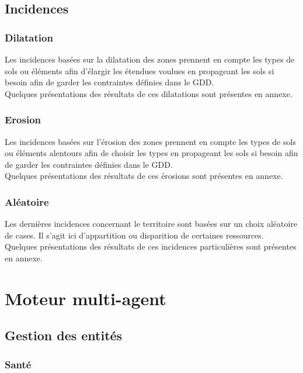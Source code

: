 \documentclass[a4paper]{article}
\newcommand{\alinea}{\hspace*{0.5cm}}
\begin{document}
      \subsection{Incidences}
        \subsubsection{Dilatation}
          \alinea Les incidences basées sur la dilatation des zones prennent en compte les types de sols ou éléments afin d'élargir les étendues voulues en propageant les sols si besoin afin de garder les contraintes définies dans le GDD.\\
          \alinea Quelques présentations des résultats de ces dilatations sont présentes en annexe.\\
        
        \subsubsection{Erosion}
          \alinea Les incidences basées sur l'érosion des zones prennent en compte les types de sols ou éléments alentours afin de choisir les types en propageant les sols si besoin afin de garder les contraintes définies dans le GDD.\\
          \alinea Quelques présentations des résultats de ces érosions sont présentes en annexe.\\
        
        \subsubsection{Aléatoire}
          \alinea Les dernières incidences concernant le territoire sont basées sur un choix aléatoire de cases. Il s'agit ici d'appartition ou disparition de certaines ressources.\\
          \alinea Quelques présentations des résultats de ces incidences particulières sont présentes en annexe.\\

	\section{Moteur multi-agent}
	
		\subsection{Gestion des entités}
		
			\subsubsection{Santé}
\end{document}
